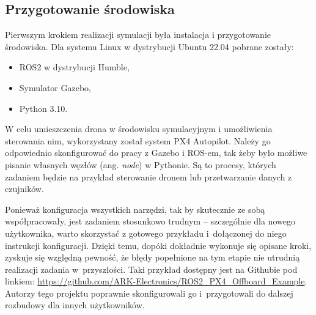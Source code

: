 


\subsection{Przygotowanie środowiska}

Pierwszym krokiem realizacji symulacji była instalacja i przygotowanie środowiska. Dla systemu Linux w dystrybucji Ubuntu 22.04 pobrane zostały:
\begin{itemize}
    \item ROS2 w dystrybucji Humble,
    \item Symulator Gazebo,
    \item Python 3.10.
\end{itemize}


W celu umieszczenia drona w środowisku symulacyjnym i umożliwienia sterowania nim, wykorzystany został system PX4 Autopilot. Należy go odpowiednio skonfigurować do pracy z Gazebo i ROS-em, tak żeby było możliwe pisanie własnych węzłów (ang. \textit{node}) w Pythonie. Są to procesy, których zadaniem będzie na przykład sterowanie dronem lub przetwarzanie danych z czujników.

Ponieważ konfiguracja wszystkich narzędzi, tak by skutecznie ze sobą współpracowały, jest zadaniem stosunkowo trudnym -- szczególnie dla nowego użytkownika, warto skorzystać z gotowego przykładu i~dołączonej do niego instrukcji konfiguracji. Dzięki temu, dopóki dokładnie wykonuje się opisane kroki, zyskuje się względną pewność, że błędy popełnione na tym etapie nie utrudnią realizacji zadania w~przyszłości. Taki przykład dostępny jest na Githubie pod linkiem: \url{https://github.com/ARK-Electronics/ROS2_PX4_Offboard_Example}. Autorzy tego projektu poprawnie skonfigurowali go i~przygotowali do dalszej rozbudowy dla innych użytkowników.

